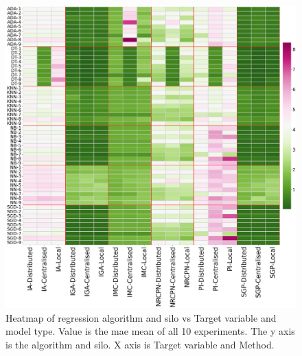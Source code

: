 \begin{figure}[htbp]
\centering
\captionsetup{justification=centering}

\caption[Heatmap of regression algorithm and silo vs Target variable and model type.]{Heatmap of regression algorithm and silo vs Target variable and model type. Value is the \ac{mae} mean of all 10 experiments. The y axis is the algorithm and silo. X axis is Target variable and Method.}\label{fig:heatmpa-int} 
\includegraphics[scale=0.22]{figures/heatmap-reg.png}
\end{figure}


